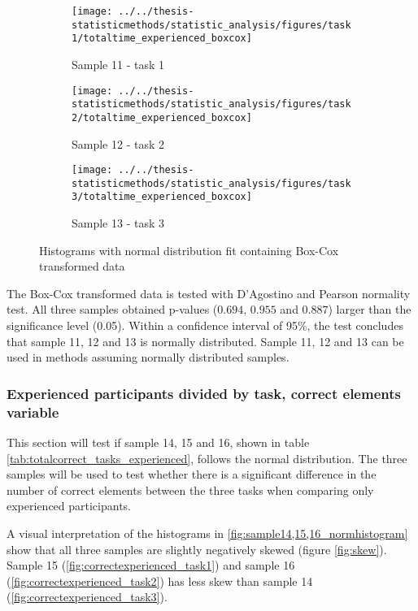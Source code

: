 \begin{figure}[H]
	\centering
	\begin{subfigure}[b]{0.32\textwidth}
		\centering
		\texttt{[image: ../../thesis-statisticmethods/statistic\_analysis/figures/task1/totaltime\_experienced\_boxcox]}
		\caption{Sample 11 - task 1}
		\label{fig:totaltimeexperiencedboxcox_task1}
	\end{subfigure}
	\begin{subfigure}[b]{0.32\textwidth}
		\centering
		\texttt{[image: ../../thesis-statisticmethods/statistic\_analysis/figures/task2/totaltime\_experienced\_boxcox]}
		\caption{Sample 12 - task 2}
		\label{fig:totaltimeexperiencedboxcox_task2}
	\end{subfigure}
	\begin{subfigure}[b]{0.32\textwidth}
		\centering
		\texttt{[image: ../../thesis-statisticmethods/statistic\_analysis/figures/task3/totaltime\_experienced\_boxcox]}
		\caption{Sample 13 - task 3}
		\label{fig:totaltimeexperiencedboxcox_task3}
	\end{subfigure}
	\caption{Histograms with normal distribution fit containing Box-Cox transformed data}
	\label{fig:sample11_12_13_boxcox_histogram}
\end{figure}

The Box-Cox transformed data is tested with D'Agostino and Pearson normality test. All three samples obtained p-values ($0.694$, $0.955$ and $0.887$) larger than the significance level (0.05). Within a confidence interval of 95\%, the test concludes that sample 11, 12 and 13 is normally distributed. Sample 11, 12 and 13 can be used in methods assuming normally distributed samples. 

\subsubsection[Sample 14, 15 and 16]{Experienced participants divided by task, correct elements variable}
This section will test if sample 14, 15 and 16, shown in table \ref{tab:totalcorrect_tasks_experienced}, follows the normal distribution. The three samples will be used to test whether there is a significant difference in the number of correct elements between the three tasks when comparing only experienced participants. 

A visual interpretation of the histograms in \ref{fig:sample14,15,16_normhistogram} show that all three samples are slightly negatively skewed (figure \ref{fig:skew}). Sample 15 (\ref{fig:correctexperienced_task1}) and sample 16 (\ref{fig:correctexperienced_task2}) has less skew than sample 14 (\ref{fig:correctexperienced_task3}).  

